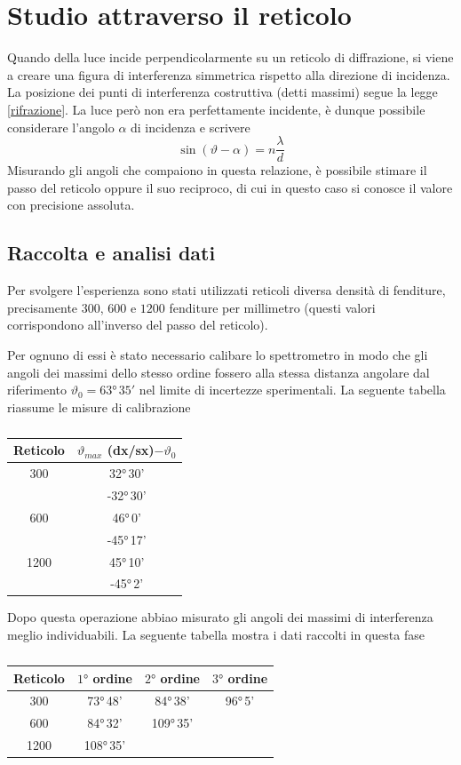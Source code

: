 \section{Studio attraverso il reticolo}
Quando della luce incide perpendicolarmente su un reticolo di diffrazione, si viene a creare una figura di interferenza simmetrica rispetto alla direzione di incidenza. La posizione dei punti di interferenza costruttiva (detti massimi) segue la legge \ref{rifrazione}. La luce però non era perfettamente incidente, è dunque possibile considerare l'angolo $\alpha$ di incidenza e scrivere
$$
\sin(\vartheta -\alpha)=n\dfrac{\lambda}{d}
$$
Misurando gli angoli che compaiono in questa relazione, è possibile stimare il passo del reticolo oppure il suo reciproco, di cui in questo caso si conosce il valore con precisione assoluta.
\subsection{Raccolta e analisi dati}
Per svolgere l'esperienza sono stati utilizzati reticoli diversa densità di fenditure, precisamente $300$, $600$ e $1200$ fenditure per millimetro (questi valori corrispondono all'inverso del passo del reticolo).

Per ognuno di essi è stato necessario calibare lo spettrometro in modo che gli angoli dei massimi dello stesso ordine fossero alla stessa distanza angolare dal riferimento $\vartheta_0=\ang{63}\,35'$ nel limite di incertezze sperimentali. La seguente tabella riassume le misure di calibrazione
\begin{table}[h!]
    \centering
    \begin{tabular}{cc}
    \toprule
         Reticolo & $\vartheta_{max}$ (dx/sx)$-\vartheta_0$ \\
         \midrule
         300 & \ang{32}\,30'\\
             & -\ang{32}\,30'\\
        \midrule
         600 &  \ang{46}\,0'\\
          &-\ang{45}\,17'\\
        \midrule
        1200 & \ang{45}\,10'\\
        & -\ang{45}\,2'\\
    \bottomrule
    \end{tabular}
    \caption{}
    \label{tab:my_label}
\end{table}
Dopo questa operazione abbiao misurato gli angoli dei massimi di interferenza meglio individuabili. La seguente tabella mostra i dati raccolti in questa fase
\begin{table}[h!]
    \centering
    \begin{tabular}{cccc}
    \toprule
    Reticolo & $\ang{1}$ ordine & $\ang{2}$ ordine & $\ang{3}$ ordine \\
    \midrule
    300     & \ang{73}\,48’ & \ang{84}\,38'&\ang{96}\,5'\\
    \midrule
    600     &\ang{84}\,32' & \ang{109}\,35' & \\
    \midrule
    1200 & \ang{108}\,35' & &\\
    \bottomrule
    \end{tabular}
    \caption{}
    \label{tab:my_label}
\end{table}
